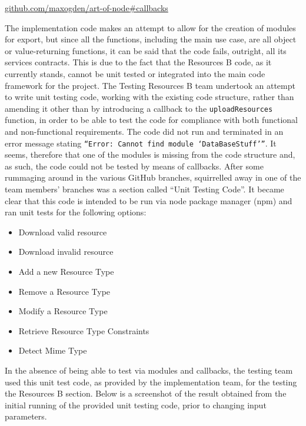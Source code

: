 \documentclass[a4paper]{article}
\begin{document}
\url{github.com/maxogden/art-of-node#callbacks}

The implementation code makes an attempt to allow for the creation of modules for export, but since all the functions, including the main use case, are all object or value-returning functions, it can be said that the code fails, outright, all its services contracts. This is due to the fact that the Resources B code, as it currently stands, cannot be unit tested or integrated into the main code framework for the project. 
The Testing Resources B team undertook an attempt to write unit testing code, working with the existing code structure, rather than amending it other than by introducing a callback to the \texttt{uploadResources} function, in order to be able to test the code for compliance with both functional and non-functional requirements. The code did not run and terminated in an error message stating \texttt{“Error: Cannot find module ‘DataBaseStuff’”}. It seems, therefore that one of the modules is missing from the code structure and, as such, the code could not be tested by means of callbacks.
After some rummaging around in the various GitHub branches, squirrelled away in one of the team members’ branches was a section called “Unit Testing Code”. It became clear that this code is intended to be run via node package manager (npm) and ran unit tests for the following options: 
\begin{itemize}
\item	Download valid resource
\item	Download invalid resource
\item	Add a new Resource Type
\item	Remove a Resource Type
\item	Modify a Resource Type
\item	Retrieve Resource Type Constraints
\item	Detect Mime Type
\end{itemize}
In the absence of being able to test via modules and callbacks, the testing team used this unit test code, as provided by the implementation team, for the testing the Resources B section. Below is a screenshot of the result obtained from the initial running of the provided unit testing code, prior to changing input parameters.
\end{document}
